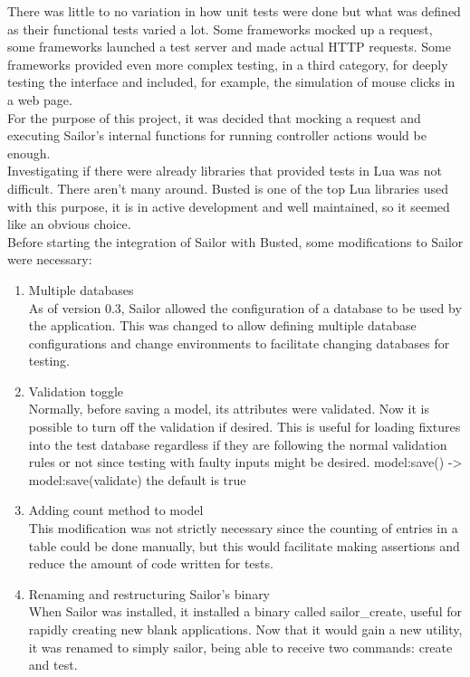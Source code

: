 \documentclass{article}
\begin{document}
There was little to no variation in how unit tests were done but what was defined as their functional tests varied a lot. Some frameworks mocked up a request, some frameworks launched a test server and made actual HTTP requests. Some frameworks provided even more complex testing, in a third category, for deeply testing the interface and included, for example, the simulation of mouse clicks in a web page. \\

For the purpose of this project, it was decided that mocking a request and executing Sailor's internal functions for running controller actions would be enough.\\

Investigating if there were already libraries that provided tests in Lua was not difficult. There aren't many around. Busted\autocite{busted}  is one of the top Lua libraries used with this purpose, it is in active development and well maintained, so it seemed like an obvious choice. \\

Before starting the integration of Sailor with Busted, some modifications to Sailor were necessary:\\

\begin{enumerate}\item Multiple databases\\
As of version 0.3, Sailor allowed the configuration of a database to be used by the application. This was changed to allow defining multiple database configurations and change environments to facilitate changing databases for testing.

\item Validation toggle \\
Normally, before saving a model, its attributes were validated. Now it is possible to turn off the validation if desired. This is useful for loading fixtures into the test database regardless if they are following the normal validation rules or not since testing with faulty inputs might be desired.
model:save() -> model:save(validate)
the default is true

\item Adding count method to model \\
This modification was not strictly necessary since the counting of entries in a table could be done manually, but this would facilitate making assertions and reduce the amount of code written for tests.

\item Renaming and restructuring Sailor's binary\\
When Sailor was installed, it installed a binary called sailor\_create, useful for rapidly creating new blank applications. Now that it would gain a new utility, it was renamed to simply sailor, being able to receive two commands: create and test.
\end{enumerate}
\end{document}
